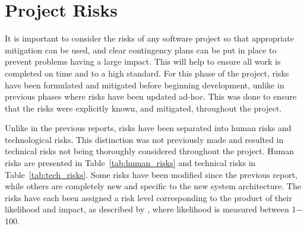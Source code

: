 \documentclass[10pt,a4paper]{article}
\begin{document}
\section{Project Risks}
\label{sec:risks}
It is important to consider the risks of any software project so that appropriate mitigation can be used, and clear contingency plans can be put in place to prevent problems having a large impact. This will help to ensure all work is completed on time and to a high standard. For this phase of the project, risks have been formulated and mitigated before beginning development, unlike in previous phases where risks have been updated ad-hoc. This was done to ensure that the risks were explicitly known, and mitigated, throughout the project. 

Unlike in the previous reports, risks have been separated into human risks and technological risks. This distinction was not previously made and resulted in technical risks not being thoroughly considered throughout the project. Human risks are presented in Table~\ref{tab:human_risks} and technical risks in Table~\ref{tab:tech_risks}.
Some risks have been modified since the previous report, while others are completely new and specific to the new system architecture. The risks have each been assigned a risk level corresponding to the product of their likelihood and impact, as described by \cite{risks}, where likelihood is measured between 1$-$100.
\end{document}
